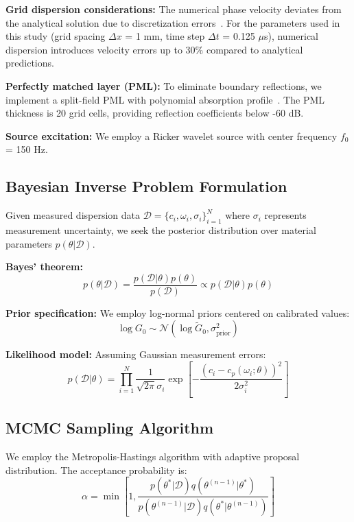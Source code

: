 \documentclass[journal]{IEEEtran}
\begin{document}
\textbf{Grid dispersion considerations:} The numerical phase velocity deviates from the analytical solution due to discretization errors~\cite{taflove2005}. For the parameters used in this study (grid spacing $\Delta x$ = 1 mm, time step $\Delta t$ = 0.125 $\mu$s), numerical dispersion introduces velocity errors up to 30\% compared to analytical predictions.

\textbf{Perfectly matched layer (PML):} To eliminate boundary reflections, we implement a split-field PML with polynomial absorption profile~\cite{berenger1994}. The PML thickness is 20 grid cells, providing reflection coefficients below -60 dB.

\textbf{Source excitation:} We employ a Ricker wavelet source with center frequency $f_0$ = 150 Hz.

\subsection{Bayesian Inverse Problem Formulation}

Given measured dispersion data $\mathcal{D} = \{c_i, \omega_i, \sigma_i\}_{i=1}^{N}$ where $\sigma_i$ represents measurement uncertainty, we seek the posterior distribution over material parameters $p(\theta | \mathcal{D})$.

\textbf{Bayes' theorem:}
\begin{equation}
p(\theta | \mathcal{D}) = \frac{p(\mathcal{D} | \theta) p(\theta)}{p(\mathcal{D})} \propto p(\mathcal{D} | \theta) p(\theta)
\end{equation}

\textbf{Prior specification:} We employ log-normal priors centered on calibrated values:
\begin{equation}
\log G_0 \sim \mathcal{N}(\log \tilde{G}_0, \sigma_{\text{prior}}^2)
\end{equation}

\textbf{Likelihood model:} Assuming Gaussian measurement errors:
\begin{equation}
p(\mathcal{D} | \theta) = \prod_{i=1}^{N} \frac{1}{\sqrt{2\pi}\sigma_i} \exp\left[ -\frac{(c_i - c_p(\omega_i; \theta))^2}{2\sigma_i^2} \right]
\end{equation}

\subsection{MCMC Sampling Algorithm}

We employ the Metropolis-Hastings algorithm with adaptive proposal distribution. The acceptance probability is:
\begin{equation}
\alpha = \min\left[1, \frac{p(\theta^*|\mathcal{D})q(\theta^{(n-1)}|\theta^*)}{p(\theta^{(n-1)}|\mathcal{D})q(\theta^*|\theta^{(n-1)})}\right]
\end{equation}
\end{document}
